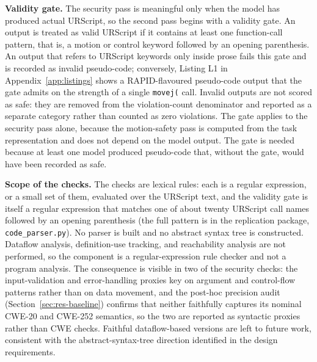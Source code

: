 \documentclass{ieeeaccess}
\begin{document}
\textbf{Validity gate.} The security pass is meaningful only when the model has
produced actual URScript, so the second pass begins with a validity gate. An output
is treated as valid URScript if it contains at least one function-call pattern, that
is, a motion or control keyword followed by an opening parenthesis. An output that
refers to URScript keywords only inside prose fails this gate and is recorded as
invalid pseudo-code; conversely, Listing L1 in Appendix~\ref{app:listings} shows a
RAPID-flavoured pseudo-code output that the gate admits on the strength of a single
\texttt{movej(} call. Invalid outputs are not scored as safe: they are removed from
the violation-count denominator and reported as a separate category rather than
counted as zero violations. The gate applies to the security pass alone, because the
motion-safety pass is computed from the task representation and does not depend on
the model output. The gate is needed because at least one model produced pseudo-code
that, without the gate, would have been recorded as safe.

\textbf{Scope of the checks.} The checks are lexical rules: each is a regular expression, or a small set of them, evaluated over the URScript text, and the validity gate is itself a regular expression that matches one of about twenty URScript call names followed by an opening parenthesis (the full pattern is in the replication package, \texttt{code\_parser.py}). No parser is built and no abstract syntax tree is constructed. Dataflow analysis, definition-use tracking, and reachability analysis are not performed, so the component is a regular-expression rule checker and not a program analysis. The consequence is visible in two of the security checks: the input-validation and error-handling proxies key on argument and control-flow patterns rather than on data movement, and the post-hoc precision audit (Section~\ref{sec:res-baseline}) confirms that neither faithfully captures its nominal CWE-20 and CWE-252 semantics, so the two are reported as syntactic proxies rather than CWE checks. Faithful dataflow-based versions are left to future work, consistent with the abstract-syntax-tree direction identified in the design requirements.
\end{document}

